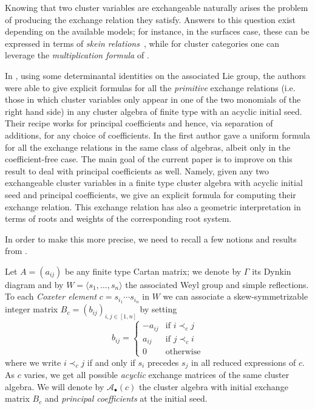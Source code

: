 \documentclass[pdftex]{sigma}
\numberwithin{equation}{section}
\numberwithin{figure}{section}
\newcommand{\cA}{\mathcal{A}}
\begin{document}
  Knowing that two cluster variables are exchangeable naturally arises the problem of producing the exchange relation they satisfy.
  Answers to this question exist depending on the available models; for instance, in the surfaces case, these can be expressed in terms of \emph{skein relations}~\cite{MW13}, while for cluster categories one can leverage the \emph{multiplication formula} of \cite{CK08}.

  In \cite{YZ08}, using some determinantal identities on the associated Lie group, the authors were able to give explicit formulas for all the \emph{primitive} exchange relations (i.e. those in which cluster variables only appear in one of the two monomials of the right hand side) in any cluster algebra of finite type with an acyclic initial seed.
  Their recipe works for principal coefficients and hence, via separation of additions, for any choice of coefficients.
  In \cite{Ste13} the first author gave a uniform formula for all the exchange relations in the same class of algebras, albeit only in the coefficient-free case.
  The main goal of the current paper is to improve on this result to deal with principal coefficients as well.
  Namely, given any two exchangeable cluster variables in a finite type cluster algebra with acyclic initial seed and principal coefficients, we give an explicit formula for computing their exchange relation.
  This exchange relation has also a geometric interpretation in terms of roots and weights of the corresponding root system.


  In order to make this more precise, we need to recall a few notions and results from \cite{Ste13,YZ08}.

  Let $A=(a_{ij})$ be any finite type Cartan matrix; we denote by $\Gamma$ its Dynkin diagram and by $W=\langle s_1,\dots,s_n\rangle$ the associated Weyl group and simple reflections.
  To each \emph{Coxeter element} $c=s_{i_1}\cdots s_{i_n}$ in $W$ we can associate a skew-symmetrizable integer matrix $B_c=(b_{ij})_{i,j\in[1,n]}$ by setting
  \[
    b_{ij}=
    \begin{cases}
      -a_{ij} & \text{if } i\prec_c j  \\
      a_{ij}  & \text{if } j\prec_c i  \\
      0       & \text{otherwise}
    \end{cases}
  \]
  where we write $i\prec_c j$ if and only if $s_i$ precedes $s_j$ in all reduced expressions of $c$.
  As $c$ varies, we get all possible \emph{acyclic} exchange matrices of the same cluster algebra.
  We will denote by $\cA_\bullet(c)$ the cluster algebra with initial exchange matrix $B_c$ and  \emph{principal coefficients} at the initial seed.
\end{document}
